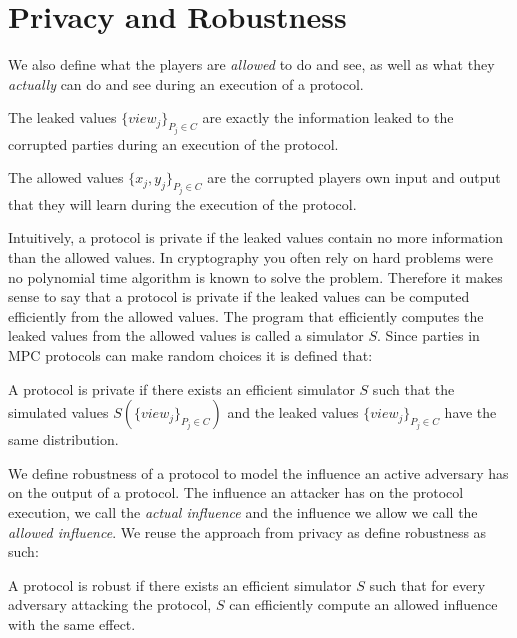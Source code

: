 \section{Privacy and Robustness} 
We also define what the players are \emph{allowed} to do and see, as well as what they \emph{actually} can do and see during an execution of a protocol\cite{mpc-book}.

\begin{mydef}
The leaked values $\{view_j\}_{P_j \in C}$ are exactly the information leaked to the corrupted parties during an execution of the protocol.
\end{mydef}

\begin{mydef}
The allowed values $\{x_j,y_j\}_{P_j \in C}$ are the corrupted players own input and output that they will learn during the execution of the protocol.
\end{mydef}

Intuitively, a protocol is private if the leaked values contain no more information than the allowed values. In cryptography you often rely on hard problems were no polynomial time algorithm is known to solve the problem. Therefore it makes sense to say that a protocol is private if the leaked values can be computed efficiently from the allowed values. The program that efficiently computes the leaked values from the allowed values is called a simulator $S$. Since parties in MPC protocols can make random choices it is defined that:

\begin{mydef}[Privacy]\label{def:privacy}
A protocol is private if there exists an efficient simulator $S$ such that the simulated values $S(\{view_j\}_{P_j \in C})$ and the leaked values $\{view_j\}_{P_j \in C}$ have the same distribution.
\end{mydef}

We define robustness of a protocol to model the influence an active adversary has on the output of a protocol.
The influence an attacker has on the protocol execution, we call the \emph{actual influence} and the influence we allow we call the \emph{allowed influence}. We reuse the approach from privacy as define robustness as such:

\begin{mydef}[Robustness]
A protocol is robust if there exists an efficient simulator $S$ such that for every adversary attacking the protocol, $S$ can efficiently compute an allowed influence with the same effect.
\end{mydef}

